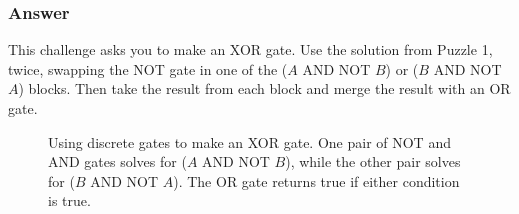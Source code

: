 \vfill

\subsubsection*{Answer}

This challenge asks you to make an XOR gate. Use the solution from Puzzle 1, twice, swapping the NOT gate in one of the ($A$ AND NOT $B$) or ($B$ AND NOT $A$) blocks. Then take the result from each block and merge the result with an OR gate.

\begin{figure}[hb!]
\begin{center}



\caption{Using discrete gates to make an XOR gate. One pair of NOT and AND gates solves for ($A$ AND NOT $B$), while the other pair solves for ($B$ AND NOT $A$). The OR gate returns true if either condition is true.}

\end{center}
\end{figure}
